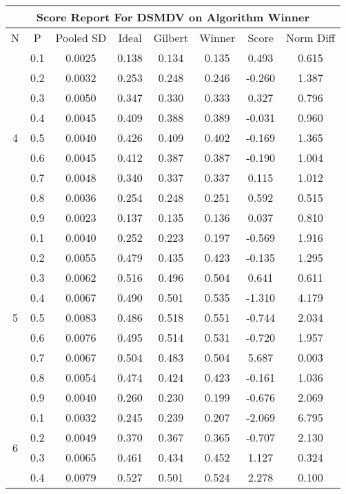 \documentclass[11pt,a4paper]{report}
\begin{document}
\begin{longtable}{ | c | c || c | c | c | c | c | c | }
\hline
\multicolumn{8}{|c|}{ Score Report For DSMDV on Algorithm Winner} \\
\hline
N & P & Pooled SD &  Ideal &  Gilbert & Winner  & Score & Norm Diff \\
 \hline
 \hline
 \endhead
\multirow{9}{*}{4} & 0.1 & 0.0025 & 0.138 & 0.134 & 0.135 & 0.493 & 0.615 \\
 & 0.2 & 0.0032 & 0.253 & 0.248 & 0.246 & -0.260 & 1.387 \\
 & 0.3 & 0.0050 & 0.347 & 0.330 & 0.333 & 0.327 & 0.796 \\
 & 0.4 & 0.0045 & 0.409 & 0.388 & 0.389 & -0.031 & 0.960 \\
 & 0.5 & 0.0040 & 0.426 & 0.409 & 0.402 & -0.169 & 1.365 \\
 & 0.6 & 0.0045 & 0.412 & 0.387 & 0.387 & -0.190 & 1.004 \\
 & 0.7 & 0.0048 & 0.340 & 0.337 & 0.337 & 0.115 & 1.012 \\
 & 0.8 & 0.0036 & 0.254 & 0.248 & 0.251 & 0.592 & 0.515 \\
 & 0.9 & 0.0023 & 0.137 & 0.135 & 0.136 & 0.037 & 0.810 \\
 \hline
\multirow{9}{*}{5} & 0.1 & 0.0040 & 0.252 & 0.223 & 0.197 & -0.569 & 1.916 \\
 & 0.2 & 0.0055 & 0.479 & 0.435 & 0.423 & -0.135 & 1.295 \\
 & 0.3 & 0.0062 & 0.516 & 0.496 & 0.504 & 0.641 & 0.611 \\
 & 0.4 & 0.0067 & 0.490 & 0.501 & 0.535 & -1.310 & 4.179 \\
 & 0.5 & 0.0083 & 0.486 & 0.518 & 0.551 & -0.744 & 2.034 \\
 & 0.6 & 0.0076 & 0.495 & 0.514 & 0.531 & -0.720 & 1.957 \\
 & 0.7 & 0.0067 & 0.504 & 0.483 & 0.504 & 5.687 & 0.003 \\
 & 0.8 & 0.0054 & 0.474 & 0.424 & 0.423 & -0.161 & 1.036 \\
 & 0.9 & 0.0040 & 0.260 & 0.230 & 0.199 & -0.676 & 2.069 \\
 \hline
\multirow{9}{*}{6} & 0.1 & 0.0032 & 0.245 & 0.239 & 0.207 & -2.069 & 6.795 \\
 & 0.2 & 0.0049 & 0.370 & 0.367 & 0.365 & -0.707 & 2.130 \\
 & 0.3 & 0.0065 & 0.461 & 0.434 & 0.452 & 1.127 & 0.324 \\
 & 0.4 & 0.0079 & 0.527 & 0.501 & 0.524 & 2.278 & 0.100 \\

\end{longtable}
\end{document}
